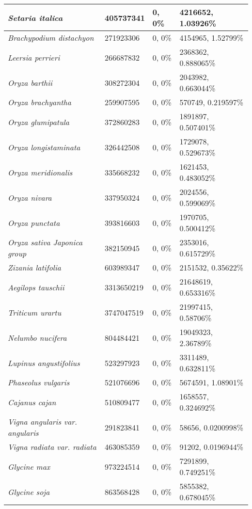 {\begin{longtable}{| L{4cm} | L{2.7cm}  | L{3.7cm} | L{3.7cm} |}
\textit{Setaria italica} & 405737341 & 0, 0\% & 4216652, 1.03926\% \\ \hline
\textit{Brachypodium distachyon} & 271923306 & 0, 0\% & 4154965, 1.52799\% \\ \hline
\textit{Leersia perrieri} & 266687832 & 0, 0\% & 2368362, 0.888065\% \\ \hline
\textit{Oryza barthii} & 308272304 & 0, 0\% & 2043982, 0.663044\% \\ \hline
\textit{Oryza brachyantha} & 259907595 & 0, 0\% & 570749, 0.219597\% \\ \hline
\textit{Oryza glumipatula} & 372860283 & 0, 0\% & 1891897, 0.507401\% \\ \hline
\textit{Oryza longistaminata} & 326442508 & 0, 0\% & 1729078, 0.529673\% \\ \hline
\textit{Oryza meridionalis} & 335668232 & 0, 0\% & 1621453, 0.483052\% \\ \hline
\textit{Oryza nivara} & 337950324 & 0, 0\% & 2024556, 0.599069\% \\ \hline
\textit{Oryza punctata} & 393816603 & 0, 0\% & 1970705, 0.500412\% \\ \hline
\textit{Oryza sativa Japonica group} & 382150945 & 0, 0\% & 2353016, 0.615729\% \\ \hline
\textit{Zizania latifolia} & 603989347 & 0, 0\% & 2151532, 0.35622\% \\ \hline
\textit{Aegilops tauschii} & 3313650219 & 0, 0\% & 21648619, 0.653316\% \\ \hline
\textit{Triticum urartu} & 3747047519 & 0, 0\% & 21997415, 0.58706\% \\ \hline
\textit{Nelumbo nucifera} & 804484421 & 0, 0\% & 19049323, 2.36789\% \\ \hline
\textit{Lupinus angustifolius} & 523297923 & 0, 0\% & 3311489, 0.632811\% \\ \hline
\textit{Phaseolus vulgaris} & 521076696 & 0, 0\% & 5674591, 1.08901\% \\ \hline
\textit{Cajanus cajan} & 510809477 & 0, 0\% & 1658557, 0.324692\% \\ \hline
\textit{Vigna angularis var. angularis} & 291823841 & 0, 0\% & 58656, 0.0200998\% \\ \hline
\textit{Vigna radiata var. radiata} & 463085359 & 0, 0\% & 91202, 0.0196944\% \\ \hline
\textit{Glycine max} & 973224514 & 0, 0\% & 7291899, 0.749251\% \\ \hline
\textit{Glycine soja} & 863568428 & 0, 0\% & 5855382, 0.678045\% \\ \hline

\end{longtable}}
